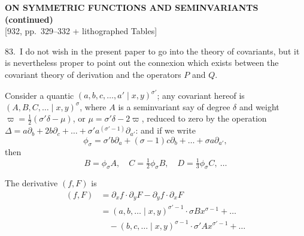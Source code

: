 \documentclass[11pt]{article}
\begin{document}
\setcounter{page}{329}

\begin{center}
{\large\bfseries ON SYMMETRIC FUNCTIONS AND SEMINVARIANTS (continued)}\\[0.4em]
{\small [932, pp.\ 329--332 + lithographed Tables]}
\end{center}
\vspace{0.4em}

83.\ I do not wish in the present paper to go into the theory of covariants, but it is nevertheless proper to point out the connexion which exists between the covariant theory of derivation and the operators $P$ and $Q$.

Consider a quantic $(a, b, c, \ldots, a' \mid x, y)^{\sigma'}$; any covariant hereof is $(A, B, C, \ldots \mid x, y)^{\sigma}$, where $A$ is a seminvariant say of degree $\delta$ and weight $\varpi = \tfrac{1}{2}(\sigma' \delta - \mu)$, or $\mu = \sigma' \delta - 2\varpi$, reduced to zero by the operation $\Delta = a\partial_b + 2b\partial_c + \ldots + \sigma' a^{(\sigma'-1)}\partial_{a'}$: and if we write
\[
\phi_\sigma = \sigma' b\partial_a + (\sigma - 1) c\partial_b + \ldots + \sigma a\partial_{a'},
\]
then
\[
B = \phi_\sigma A,\quad C = \tfrac{1}{2}\phi_\sigma B,\quad D = \tfrac{1}{3}\phi_\sigma C,\ \ldots
\]

The derivative $(f, F)$ is
\begin{align*}
(f, F) &= \partial_x f\cdot\partial_y F - \partial_y f\cdot\partial_x F \\
       &= (a, b, \ldots \mid x, y)^{\sigma'-1}\cdot\sigma B x^{\sigma-1} + \ldots \\
       &\quad - (b, c, \ldots \mid x, y)^{\sigma-1}\cdot\sigma' A x^{\sigma'-1} + \ldots
\end{align*}
\end{document}
